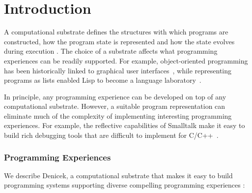 \documentclass[sigconf]{acmart}
\newcommand{\diff}[1]{{#1}}
\newcommand{\note}[1]{}
\begin{document}
\section{Introduction}

A computational substrate defines the structures with which programs are constructed, how
the program state is represented and how the state evolves during execution \cite{jakubovic-2022-ladder}.
The choice of a substrate affects what programming experiences can be readily supported.
For example, object-oriented programming has been historically linked to graphical user
interfaces~\cite{kay-1993-smalltalk}, while representing programs as lists enabled Lisp to become
a language laboratory~\cite{steele-1993-lisp}.

In principle, any programming experience can be developed on top of any computational
substrate. However, a suitable program representation can eliminate much of the complexity of implementing interesting
programming experiences. For example, the reflective capabilities of Smalltalk make it easy
to build rich debugging tools \cite{rauch-2019-babylonian} that are difficult to implement
for C/C++~\cite{kell-2018-unix,kell-2024-debugging}.

\subsubsection*{Programming Experiences}

\note{Revised to say Denicek is a substrate used to build programming systems.}
\diff{We describe Denicek, a computational substrate that makes it easy to build programming systems
supporting diverse compelling programming experiences \cite{myers-2006-eup}:}
\end{document}
